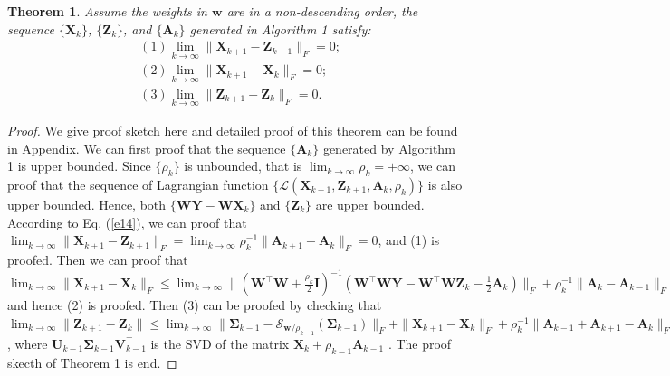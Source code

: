 \documentclass[10pt,twocolumn,letterpaper]{article}
\newtheorem{theorem}{Theorem}
\begin{document}
\begin{theorem}
Assume the weights in $\bm{w}$ are in a non-descending order, the sequence $\{\mathbf{X}_{k}\}$, $\{\mathbf{Z}_{k}\}$, and $\{\mathbf{A}_{k}\}$ generated in Algorithm 1 satisfy:
\begin{align}
&(1) \lim_{k \to \infty} \|\mathbf{X}_{k+1}-\mathbf{Z}_{k+1}\|_{F}=0;
\\
&(2) \lim_{k \to \infty} \|\mathbf{X}_{k+1}-\mathbf{X}_{k}\|_{F}=0;
\\
&(3) \lim_{k \to \infty} \|\mathbf{Z}_{k+1}-\mathbf{Z}_{k}\|_{F}=0.
\end{align}
\end{theorem}
\begin{proof}
We give proof sketch here and detailed proof of this theorem can be found in Appendix. We can first proof that the sequence $\{\mathbf{A}_{k}\}$ generated by Algorithm 1 is upper bounded. Since $\{\rho_{k}\}$ is unbounded, that is $\lim_{k\to\infty}{\rho_{k}}=+\infty$, we can proof that the sequence of Lagrangian function $\{\mathcal{L}(\mathbf{X}_{k+1},\mathbf{Z}_{k+1},\mathbf{A}_{k},\rho_{k})\}$ is also upper bounded. 
Hence, both $\{\mathbf{W}\mathbf{Y}-\mathbf{W}\mathbf{X}_{k}\}$ and $\{\mathbf{Z}_{k}\}$ are upper bounded. According to Eq. (\ref{e14}), we can proof that 
$
\lim_{k \to \infty} 
\|
\mathbf{X}_{k+1}
-
\mathbf{Z}_{k+1}
\|_{F}
=
\lim_{k \to \infty} 
\rho_{k}^{-1}
\|
\mathbf{A}_{k+1}
-
\mathbf{A}_{k}
\|_{F}
=
0
$,
and (1) is proofed. Then we can proof that 
$
\lim_{k \to \infty} 
\|
\mathbf{X}_{k+1}
-
\mathbf{X}_{k}
\|_{F}
\le
\lim_{k \to \infty} 
\|
(\mathbf{W}^{\top}\mathbf{W}
+
\frac{\rho_{k}}{2}
\mathbf{I})^{-1}
(\mathbf{W}^{\top}\mathbf{W}\mathbf{Y}
-
\mathbf{W}^{\top}\mathbf{W}\mathbf{Z}_{k}
-
\frac{1}{2}
\mathbf{A}_{k})
\|_{F}
+
\rho_{k}^{-1}\|
\mathbf{A}_{k}-\mathbf{A}_{k-1}
\|_{F}
=
0
$
and hence (2) is proofed. Then (3) can be proofed by checking that 
$
\lim_{k \to \infty} \|\mathbf{Z}_{k+1}-\mathbf{Z}_{k}\|
\le
\lim_{k \to \infty} 
\|
\mathbf{\Sigma}_{k-1}-\mathcal{S}_{\bm{w}/\rho_{k-1}}(\mathbf{\Sigma}_{k-1})
\|_{F}
+
\|
\mathbf{X}_{k+1}-\mathbf{X}_{k}
\|_{F}
+
\rho_{k}^{-1}
\|
\mathbf{A}_{k-1}
+
\mathbf{A}_{k+1}
-
\mathbf{A}_{k}
\|_{F}
=
0
$
,
where $\mathbf{U}_{k-1}\mathbf{\Sigma}_{k-1}\mathbf{V}_{k-1}^{\top}$ is the SVD of the matrix $\mathbf{X}_{k}+\rho_{k-1}\mathbf{A}_{k-1}$
.
The proof skecth of Theorem 1 is end.
\end{proof}
\end{document}
